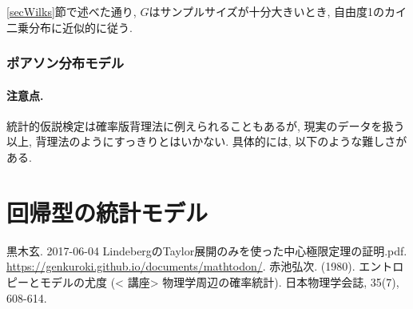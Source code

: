 \documentclass{jarticle}
\begin{document}
\ref{secWilks}節で述べた通り, $G$はサンプルサイズが十分大きいとき, 自由度1のカイ二乗分布に近似的に従う. 

\subsubsection{ポアソン分布モデル}

\paragraph{注意点.}
統計的仮説検定は確率版背理法に例えられることもあるが, 現実のデータを扱う以上, 背理法のようにすっきりとはいかない. 具体的には, 以下のような難しさがある.

\section{回帰型の統計モデル}

\begin{thebibliography}{1}
黒木玄. 2017-06-04 LindebergのTaylor展開のみを使った中心極限定理の証明.pdf. \url{https://genkuroki.github.io/documents/mathtodon/}.
 赤池弘次. (1980). エントロピーとモデルの尤度 (< 講座> 物理学周辺の確率統計). 日本物理学会誌, 35(7), 608-614.
\end{thebibliography}
\end{document}
